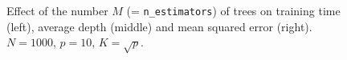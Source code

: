 \begin{figure}
\hspace{-1.75cm}
\caption{Effect of the number $M$ (= \texttt{n\_estimators})  of trees on training time (left), average depth (middle) and mean squared error (right). $N=1000$, $p=10$, $K=\sqrt{p}$.}
\label{fig:5:artificial:M}
\end{figure}

